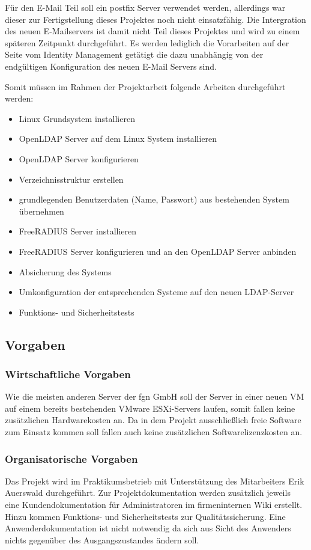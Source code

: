 \documentclass[11pt,a4paper,titlepage=firstiscover]{scrartcl} %
\begin{document}
F\"ur den E-Mail Teil soll ein postfix Server verwendet werden, allerdings war dieser zur Fertigstellung dieses Projektes noch nicht einsatzf\"ahig. Die Intergration des neuen E-Mailservers ist damit nicht Teil dieses Projektes und wird zu einem sp\"ateren Zeitpunkt durchgef\"uhrt. Es werden lediglich die Vorarbeiten auf der Seite vom Identity Management get\"atigt die dazu unabh\"angig von der endg\"ultigen Konfiguration des neuen E-Mail Servers sind.\newline

\noindent 		%
Somit m\"ussen im Rahmen der Projektarbeit folgende Arbeiten durchgef\"uhrt werden: 
\begin{itemize}
\item Linux Grundsystem installieren
\item OpenLDAP Server auf dem Linux System installieren
\item OpenLDAP Server konfigurieren
\item Verzeichnisstruktur erstellen
\item grundlegenden Benutzerdaten (Name, Passwort) aus bestehenden System \"ubernehmen
\item FreeRADIUS Server installieren
\item FreeRADIUS Server konfigurieren und an den OpenLDAP Server anbinden
\item Absicherung des Systems
\item Umkonfiguration der entsprechenden Systeme auf den neuen LDAP-Server
\item Funktions- und Sicherheitstests
\end{itemize}


\subsection{Vorgaben}
\subsubsection{Wirtschaftliche Vorgaben}
Wie die meisten anderen Server der fgn GmbH soll der Server in einer neuen VM auf einem bereits bestehenden VMware ESXi-Servers laufen, somit fallen keine zus\"atzlichen Hardwarekosten an. Da in dem Projekt  ausschlie\ss{}lich freie Software zum Einsatz kommen soll fallen auch keine zus\"atzlichen Softwarelizenzkosten an.

\subsubsection{Organisatorische Vorgaben}
Das Projekt wird im Praktikumsbetrieb mit Unterst\"utzung des Mitarbeiters Erik Auerswald durchgef\"uhrt.
Zur Projektdokumentation werden zus\"atzlich jeweils eine Kundendokumentation für Administratoren im firmeninternen Wiki erstellt. Hinzu kommen Funktions- und Sicherheitstests zur Qualit\"atssicherung. Eine Anwenderdokumentation ist nicht notwendig da sich aus Sicht des Anwenders nichts gegen\"uber des Ausgangszustandes \"andern soll.
\end{document}
